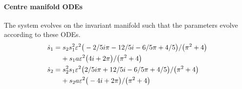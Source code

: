 \paragraph{Centre manifold ODEs} 
The system evolves on the invariant manifold such
that the parameters evolve according to these ODEs.
\begin{align*}&
\dot s_{1}=s_{2} s_{1}^{2} \varepsilon^{2} \big(-2/5 i \pi -12/5 i-6/5 \pi +4/5
\big)/\big(\pi ^{2}+4\big)
\\&\qquad{}
+s_{1} a \varepsilon^{2} \big(4 i+2 \pi \big)/\big(
\pi ^{2}+4\big)
\\&
\dot s_{2}=s_{2}^{2} s_{1} \varepsilon^{2} \big(2/5 i \pi +12/5 i-6/5 \pi +4/5
\big)/\big(\pi ^{2}+4\big)
\\&\qquad{}
+s_{2} a \varepsilon^{2} \big(-4 i+2 \pi \big)/\big(
\pi ^{2}+4\big)
\end{align*}


